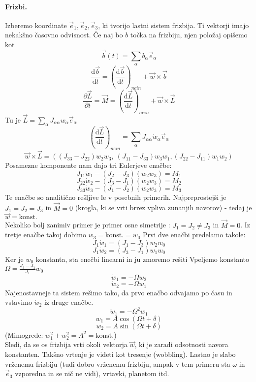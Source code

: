 \documentclass[a4paper]{article}
\newcommand{\vct}[1]{\overrightarrow{#1}}
\newcommand{\pd}[2]{\frac{\partial {#1}}{\partial {#2}}}
\newcommand{\dd}[2]{\frac{\mathrm{d} {#1}}{\mathrm{d} {#2}}}
\begin{document}
\paragraph{Frizbi.} Izberemo koordinate $\vct{e}_1, \vct{e}_2, \vct{e}_3$, ki tvorijo lastni sistem frizbija. Ti vektorji imajo nekakšno časovno odvisnost.
Če naj bo $b$ točka na frizbiju, njen položaj opišemo kot
$$\vct{b}(t) = \sum_{\alpha} b_\alpha\vct{e}_\alpha$$
$$\dd{\vct{b}}{t} = \left(\dd{\vct{b}}{t}\right)_{nein} + \vct{w}\times\vct{b}$$
$$\pd{\vct{L}}{t} = \vct{M} = \left(\dd{\vct{L}}{t}\right)_{nein} + \vct{w}\times\vct{L}$$
Tu je $\displaystyle{\vct{L} = \sum_{\alpha} J_{\alpha\alpha}w_\alpha\vct{e}_\alpha}$
$$\left(\dd{\vct{L}}{t}\right)_{nein} = \sum_\alpha J_{\alpha\alpha} \dot{w}_\alpha\vct{e}_\alpha$$
$$\vct{w}\times\vct{L} = \left((J_{33} - J_{22})w_2w_3,~(J_{11} - J_{33})w_3w_1, (J_{22} - J_{11})w_1w_2\right)$$
Posamezne komponente nam dajo tri Eulerjeve enačbe:
$$J_{11}\dot{w}_1 - (J_2 -  J_3)(w_2w_3) = M_1$$
$$J_{22}\dot{w}_2 - (J_3 -  J_1)(w_2w_3) = M_2$$
$$J_{33}\dot{w}_3 - (J_1 -  J_2)(w_2w_3) = M_3$$
Te enačbe so analitično rešljive le v posebnih primerih. Najpreprostejši je $J_1 = J_2 = J_3$ in $\vct{M} = 0$ (krogla, ki se vrti brrez vpliva zunanjih navorov) - tedaj je $\vct{w} = \text{konst.}$ \\[3mm]
Nekoliko bolj zanimiv primer je primer osne simetrije : $J_1 = J_2 \neq J_3$ in $\vct{M} = 0$.
Iz tretje enačbe takoj dobimo $w_3 = \text{konst.} = w_0$ Prvi dve enačbi predelamo takole:
$$J_1\dot{w}_1 = (J_1 - J_3)w_2w_0$$
$$J_1\dot{w}_2 = (J_3 - J_1)w_1w_0$$
Ker je $w_0$ konstanta, sta enečbi linearni in ju zmoremo rešiti Vpeljemo konstanto $\displaystyle{\Omega = \frac{J_3 - J_1}{J_1}w_0}$
$$\dot{w}_1 = -\Omega w_2$$
$$\dot{w}_2 = -\Omega w_1$$
Najenostavneje ta sistem rešimo tako, da prvo enačbo odvajamo po času in vstavimo $\dot{w}_2$ iz druge enačbe.
$$\ddot{w}_1 = -\Omega^2w_1$$
$$w_1 = A\cos(\Omega t + \delta)$$
$$w_2 = A\sin(\Omega t + \delta)$$
(Mimogrede: $w_1^2 + w_2^2 = A^2 = \text{konst.}$) \\
Sledi, da se os frizbija vrti okoli vektorja $\vct{w}$, ki je zaradi odsotnosti navora konstanten.
Takšno vrtenje je videti kot tresenje (wobbling). Lastno je slabo vrženemu frizbiju (tudi dobro vrženemu frizbiju, ampak v tem primeru sta $\omega$ in $\vct{e}_3$ vzporedna in se nič ne vidi), vrtavki, planetom itd.
\end{document}
